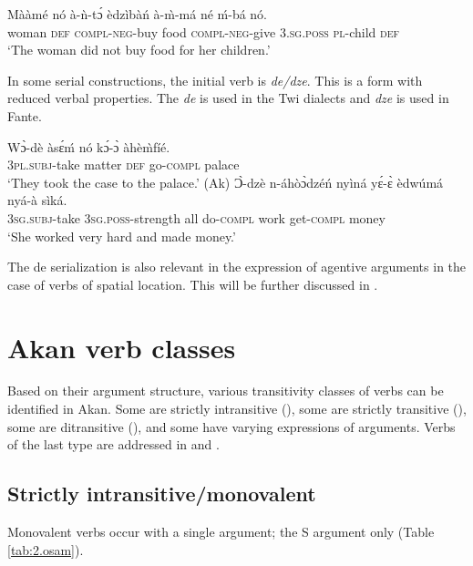 \documentclass[output=paper]{langsci/langscibook}
\begin{document}
\ea
\label{ex:20.osam}
\gll Mààmé  nó  à-ǹ-tɔ́      èdzìbàń  à-\`{m}-má  né    ḿ-bá    nó. \\
     woman  \textsc{def}  \textsc{compl}-\textsc{neg}-buy  food    \textsc{compl}-\textsc{neg}-give \textsc{3.sg.poss}  \textsc{pl}-child  \textsc{def}\\
\glt `The woman did not buy food for her children.'
\z

In some serial constructions, the initial verb is \textit{de/dze}. This is a form with reduced verbal properties. The \textit{de} is used in the Twi dialects and \textit{dze} is used in Fante. 

\ea\label{ex:21.osam}
\ea\label{ex:21a.osam}
\gll Wɔ̀-dè    àsɛ́ḿ  nó  kɔ́-ɔ̀    àhè\`{m}fíé.\\
       \textsc{3pl.subj}-take  matter  \textsc{def}  go-\textsc{compl}  palace\\
\glt   `They took the case to the palace.' (Ak)
\ex\label{ex:21b.osam}
\gll   Ɔ̀-dzè    n-áhòɔ̀dzéń    nyìná  yɛ́-ɛ̀      èdwúmá nyá-à    sìká.\\
       \textsc{3sg.subj}-take  \textsc{3sg.poss}-strength  all  do-\textsc{compl}  work get-\textsc{compl}  money\\
\glt   `She worked very hard and made money.'
\z 
\z 


The de serialization is also relevant in the expression of agentive arguments in the case of verbs of spatial location. This will be further discussed in .

\section{Akan verb classes}\label{§3:akan.osam}

Based on their argument structure, various transitivity classes of verbs can be identified in Akan. Some are strictly intransitive (), some are strictly transitive (), some are ditransitive (), and some have varying expressions of arguments. Verbs of the last type are addressed in  and .

\subsection{Strictly intransitive/monovalent}\label{§3.1:strictly.osam}

Monovalent verbs occur with a single argument; the S argument only (Table \ref{tab:2.osam}).
\end{document}

